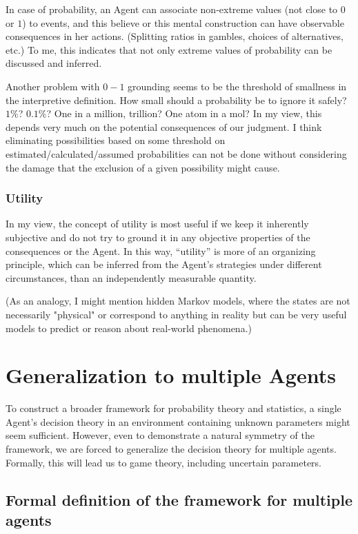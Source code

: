 \documentclass{article}
\begin{document}
In case of probability, an Agent can associate non-extreme values (not close to $0$ or $1$) to events, and this believe or this mental construction can have observable consequences in her actions. (Splitting ratios in gambles, choices of alternatives, etc.)
To me, this indicates that not only extreme values of probability can be discussed and inferred.

Another problem with $0-1$ grounding seems to be the threshold of smallness in the interpretive definition. How small should a probability be to ignore it safely? $1\%$? $0.1\%$? One in a million, trillion? One atom in a mol?
In my view, this depends very much on the potential consequences of our judgment. I think eliminating possibilities based on some threshold on estimated/calculated/assumed probabilities can not be done without considering the damage that the exclusion of a given possibility might cause.




\subsubsection*{Utility}

In my view, the concept of utility is most useful if we keep it inherently subjective and do not try to ground it in any objective properties of the consequences or the Agent.
In this way, ``utility'' is more of an organizing principle, which can be inferred from the Agent's strategies under different circumstances, than an independently measurable quantity.

(As an analogy, I might mention hidden Markov models, where the states are not necessarily "physical" or correspond to anything in reality but can be very useful models to predict or reason about real-world phenomena.)


\section*{Generalization to multiple Agents}

To construct a broader framework for probability theory and statistics, a single Agent's decision theory in an environment containing unknown parameters might seem sufficient. However, even to demonstrate a natural symmetry of the framework, we are forced to generalize the decision theory for multiple agents. Formally, this will lead us to game theory, including uncertain parameters.

\subsection*{Formal definition of the framework for multiple agents}
\end{document}
